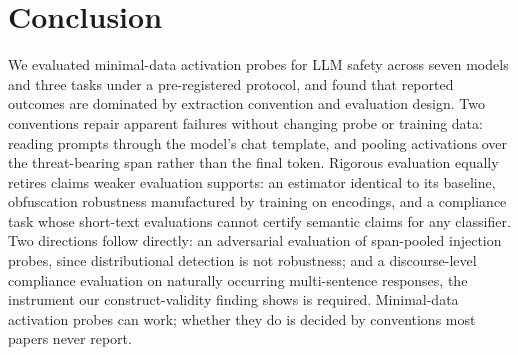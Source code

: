 \section{Conclusion}
\label{sec:conclusion}

We evaluated minimal-data activation probes for LLM safety across seven models and three tasks under a pre-registered
protocol, and found that reported outcomes are dominated by extraction convention and evaluation design. Two
conventions repair apparent failures without changing probe or training data: reading prompts through the model's chat
template, and pooling activations over the threat-bearing span rather than the final token. Rigorous evaluation equally
retires claims weaker evaluation supports: an estimator identical to its baseline, obfuscation robustness manufactured
by training on encodings, and a compliance task whose short-text evaluations cannot certify semantic claims for any
classifier. Two directions follow directly: an adversarial evaluation of span-pooled injection probes, since
distributional detection is not robustness; and a discourse-level compliance evaluation on naturally occurring
multi-sentence responses, the instrument our construct-validity finding shows is required. Minimal-data activation
probes can work; whether they do is decided by conventions most papers never report.
